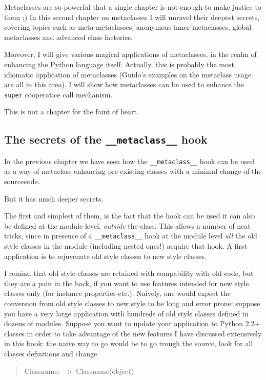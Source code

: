 \documentclass[10pt,english]{article}
\begin{document}
Metaclasses are so powerful that a single chapter is not enough to make
justice to them ;) In this second chapter on metaclasses I will 
unravel their deepest secrets, covering topics such as meta-metaclasses,
anonymous inner metaclasses, global metaclasses and advanced class factories.

Moreover, I will give various magical applications of metaclasses,
in the realm of enhancing the Python language itself. Actually, this is
probably the most idiomatic application of metaclasses (Guido's examples
on the metaclass usage are all in this area). I will show
how metaclasses can be used to enhance the \texttt{super} cooperatice call
mechanism.

This is not a chapter for the faint of heart.



\hypertarget{the-secrets-of-the-metaclass-hook}{}
\subsection*{The secrets of the \texttt{{\_}{\_}metaclass{\_}{\_}} hook}

In the previous chapter we have seen how the \texttt{{\_}{\_}metaclass{\_}{\_}} hook can
be used as a way of metaclass enhancing pre-existing classes 
with a minimal change of the sourcecode.

But it has much deeper secrets.

The first and simplest of them, 
is the fact that the hook can be used it can also be defined 
at the module level, \emph{outside} the class. This allows a number of neat 
tricks, since in presence of a  \texttt{{\_}{\_}metaclass{\_}{\_}} hook at the module
level \emph{all} the old style classes in the module (including nested ones!)
acquire that hook. A first application is to rejuvenate old style classes 
to new style classes.

I remind that old style classes are retained with compability with old 
code, but they are a pain in the back, if you want to use features 
intended for new style classes only (for instance properties etc.). 
Naively, one would expect the conversion from old style classes
to new style to be long and error prone: suppose you have a very large 
application with hundreds of old style classes defined in dozens of modules. 
Suppose you want to update your application to Python 2.2+ classes in order
to take advantage of the new features I have discussed extensively in this
book: the naive way to go would be to go trough the source, look for
all classes definitions and change
\begin{quote}
\begin{ttfamily}\begin{flushleft}
\mbox{Classname:~-->~Classname(object)}
\end{flushleft}\end{ttfamily}
\end{quote}
\end{document}
